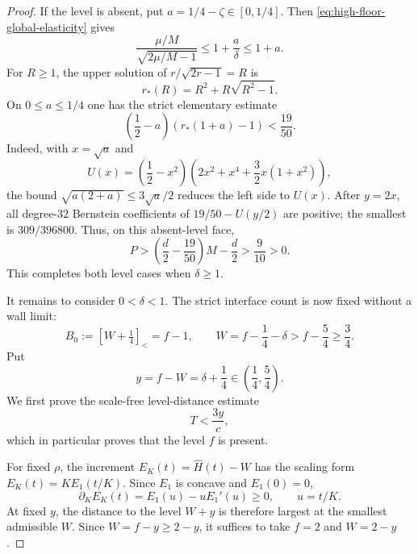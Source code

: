 \documentclass[11pt]{article}
\theoremstyle{remark}
\newcommand{\sbr}[1]{[#1]_{<}}
\begin{document}
\begin{proof}
If the level is absent, put $a=1/4-\zeta\in[0,1/4]$.  Then
\eqref{eq:high-floor-global-elasticity} gives
\[
 \frac{\mu/M}{\sqrt{2\mu/M-1}}
 \leq1+\frac a\delta\leq1+a.
\]
For $R\geq1$, the upper solution of
$r/\sqrt{2r-1}=R$ is
\[
 r_*(R)=R^2+R\sqrt{R^2-1}.
\]
On $0\leq a\leq1/4$ one has the strict elementary estimate
\begin{equation}
 \left(\frac12-a\right)(r_*(1+a)-1)<\frac{19}{50}.
 \label{eq:high-floor-absent-algebra}
\end{equation}
Indeed, with $x=\sqrt a$ and
\[
 U(x)=\left(\frac12-x^2\right)
 \left(2x^2+x^4+\frac32x(1+x^2)\right),
\]
the bound $\sqrt{a(2+a)}\leq3\sqrt a/2$ reduces the left side to
$U(x)$.  After $y=2x$, all degree-$32$ Bernstein coefficients of
$19/50-U(y/2)$ are positive; the smallest is
$309/396800$.  Thus, on this absent-level face,
\begin{equation}
 P>\left(\frac d2-\frac{19}{50}\right)M-\frac d2
 >\frac9{10}>0.
 \label{eq:high-floor-absent-level-margin}
\end{equation}
This completes both level cases when $\delta\geq1$.

It remains to consider $0<\delta<1$.  The strict interface count is now
fixed without a wall limit:
\begin{equation}
 B_0:=\sbr{W+\tfrac14}=f-1,\qquad
 W=f-\frac14-\delta>f-\frac54\geq\frac34.
 \label{eq:high-floor-global-B-zero}
\end{equation}
Put
\[
 y=f-W=\delta+\frac14\in\left(\frac14,\frac54\right).
\]
We first prove the scale-free level-distance estimate
\begin{equation}
 \boxed{T<\frac{3y}{c},}
 \label{eq:high-floor-global-level-distance}
\end{equation}
which in particular proves that the level $f$ is present.

For fixed $\rho$, the increment
$E_K(t)=\widehat H(t)-W$ has the scaling form
$E_K(t)=K E_1(t/K)$.  Since $E_1$ is concave and $E_1(0)=0$,
\[
 \partial_KE_K(t)=E_1(u)-uE_1'(u)\geq0,
 \qquad u=t/K.
\]
At fixed $y$, the distance to the level $W+y$ is therefore largest at
the smallest admissible $W$.  Since $W=f-y\geq2-y$, it suffices to take
$f=2$ and $W=2-y$.


\end{proof}
\end{document}
